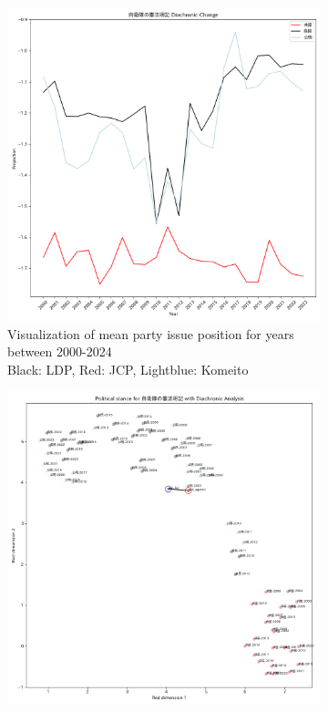 \documentclass[final,5p,times,twocolumn,authoryear]{elsarticle}
\begin{document}
\begin{figure}[h]
	\centering
		\begin{subfigure}{0.48\textwidth}
		  \centering
		  \includegraphics[width=\textwidth]{figs/results/diachronic_defence/自衛隊の憲法明記_防衛_diachronic_change.png}
		  \caption{Visualization of mean party issue position for years between 2000-2024 \\\hspace{\textwidth}Black: LDP, Red: JCP, Lightblue: Komeito}
		  \label{fig:sub1}
		\end{subfigure}
		\hfill
		\begin{subfigure}{0.48\textwidth}
		  \centering
		  \includegraphics[width=\textwidth]{figs/results/diachronic_defence/自衛隊の憲法明記_diachronic_umap.png}

\end{subfigure}
\end{figure}
\end{document}
